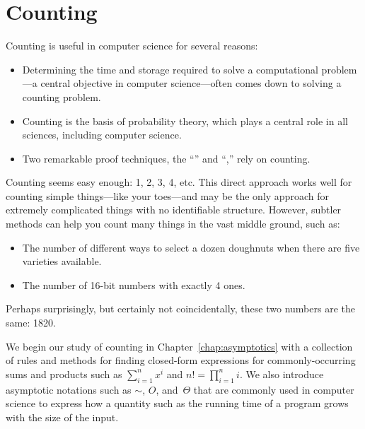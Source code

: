 \part{Counting}
\label{part:counting}

\partintro
{}

Counting is useful in computer science for several reasons:
\begin{itemize}

\item

Determining the time and storage required to solve a computational
problem---a central objective in computer science---often comes down
to solving a counting problem.

\item

Counting is the basis of probability theory, which plays a central
role in all sciences, including computer science.

\item

Two remarkable proof techniques, the ``''
and ``,'' rely on counting.
\iffalse
These lead to a variety of interesting and useful insights.
\fi

\end{itemize}

Counting seems easy enough: 1, 2, 3, 4, etc.  This direct approach
works well for counting simple things---like your toes---and may be
the only approach for extremely complicated things with no
identifiable structure.  However, subtler methods can help you count
many things in the vast middle ground, such as:
\begin{itemize}

\item The number of different ways to select a dozen doughnuts when
there are five varieties available.

\item The number of 16-bit numbers with exactly 4 ones.

\end{itemize}
Perhaps surprisingly, but certainly not coincidentally, these two
numbers are the same: 1820.

We begin our study of counting in Chapter~\ref{chap:asymptotics} with
a collection of rules and methods for finding closed-form expressions
for commonly-occurring sums and products such as $\sum_{i = 1}^n x^i$
and $n! = \prod_{i=1}^n i$.  We also introduce asymptotic notations
such as $\sim$, $O$, and~$\Theta$ that are commonly used in computer
science to express how a quantity such as the running time of a
program grows with the size of the input.

